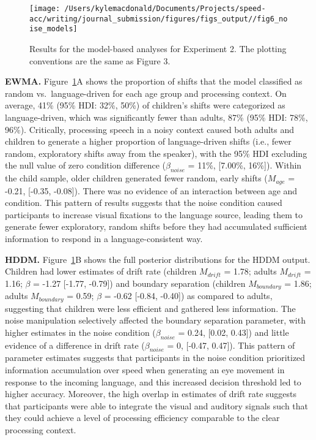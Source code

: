\documentclass[,man,floatsintext]{apa6}
\begin{document}
\begin{figure}[!t]

{\centering \texttt{[image: /Users/kylemacdonald/Documents/Projects/speed-acc/writing/journal\_submission/figures/figs\_output//fig6\_noise\_models]} 

}

\caption{Results for the model-based analyses for Experiment 2. The plotting conventions are the same as Figure 3.}\label{fig:noise-model-plots}
\end{figure}

\textbf{EWMA.} Figure~\ref{fig:noise-model-plots}A shows the proportion of shifts that the model classified as random vs.~language-driven for each age group and processing context. On average, 41\% (95\% HDI: 32\%, 50\%) of children's shifts were categorized as language-driven, which was significantly fewer than adults, 87\% (95\% HDI: 78\%, 96\%). Critically, processing speech in a noisy context caused both adults and children to generate a higher proportion of language-driven shifts (i.e., fewer random, exploratory shifts away from the speaker), with the 95\% HDI excluding the null value of zero condition difference (\(\beta_{noise}\) = 11\%, {[}7.00\%, 16\%{]}). Within the child sample, older children generated fewer random, early shifts (\(M_{age}\) = -0.21, {[}-0.35, -0.08{]}). There was no evidence of an interaction between age and condition. This pattern of results suggests that the noise condition caused participants to increase visual fixations to the language source, leading them to generate fewer exploratory, random shifts before they had accumulated sufficient information to respond in a language-consistent way.

\textbf{HDDM.} Figure~\ref{fig:noise-model-plots}B shows the full posterior distributions for the HDDM output. Children had lower estimates of drift rate (children \(M_{drift}\) = 1.78; adults \(M_{drift}\) = 1.16; \(\beta\) = -1.27 {[}-1.77, -0.79{]}) and boundary separation (children \(M_{boundary}\) = 1.86; adults \(M_{boundary}\) = 0.59; \(\beta\) = -0.62 {[}-0.84, -0.40{]}) as compared to adults, suggesting that children were less efficient and gathered less information. The noise manipulation selectively affected the boundary separation parameter, with higher estimates in the noise condition (\(\beta_{noise}\) = 0.24, {[}0.02, 0.43{]}) and little evidence of a difference in drift rate (\(\beta_{noise}\) = 0, {[}-0.47, 0.47{]}). This pattern of parameter estimates suggests that participants in the noise condition prioritized information accumulation over speed when generating an eye movement in response to the incoming language, and this increased decision threshold led to higher accuracy. Moreover, the high overlap in estimates of drift rate suggests that participants were able to integrate the visual and auditory signals such that they could achieve a level of processing efficiency comparable to the clear processing context.
\end{document}
